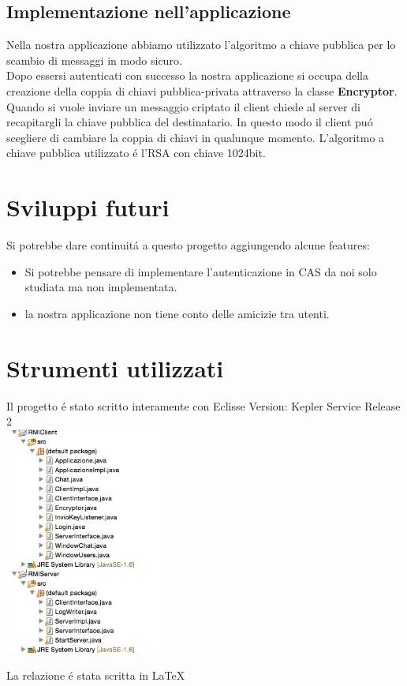 \documentclass[a4paper, 12 pt, italian]{report}
\begin{document}
\subsection{Implementazione nell'applicazione}
Nella nostra applicazione abbiamo utilizzato l'algoritmo a chiave pubblica per lo scambio di messaggi in modo sicuro.\\
Dopo essersi autenticati con successo la nostra applicazione si occupa della creazione della coppia di chiavi pubblica-privata attraverso la classe \textbf{Encryptor}.
Quando si vuole inviare un messaggio criptato il client chiede al server di recapitargli la chiave pubblica del destinatario. In questo modo il client pu\'o scegliere di cambiare la coppia di chiavi in qualunque momento. L'algoritmo a chiave pubblica utilizzato \'e l'RSA con chiave 1024bit.

\section{Sviluppi futuri}
Si potrebbe dare continuit\'a a questo progetto aggiungendo alcune features:
\begin{itemize}
\item Si potrebbe pensare di implementare l'autenticazione in CAS da noi solo studiata ma non implementata.
\item la nostra applicazione non tiene conto delle amicizie tra utenti.
\end{itemize}
\newpage
\section{Strumenti utilizzati}
Il progetto \'e stato scritto interamente con Eclisse Version: Kepler Service Release 2\\

\includegraphics[height=75mm, width=55mm]{img}

La relazione \'e stata scritta in LaTeX
  
\end{document}

